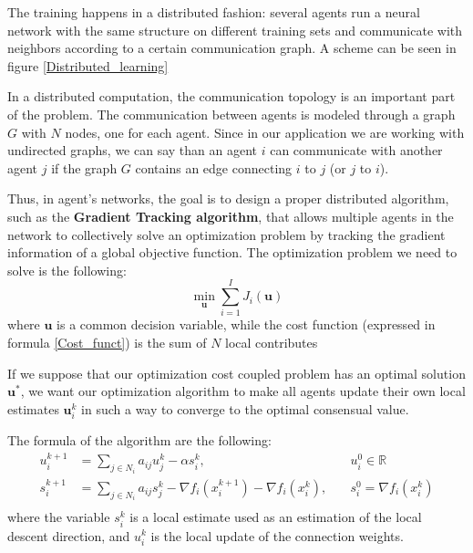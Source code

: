 \documentclass[a4paper,11pt,oneside]{book}
\begin{document}
The training happens in a distributed fashion: several agents run a neural network with the same structure on different training sets and communicate with neighbors according to a certain communication graph. A scheme can be seen in figure \ref{Distributed_learning}

\bigskip
In a distributed computation, the communication topology is an important part of the problem. The communication between agents is modeled through a graph $G$ with $N$ nodes, one for each agent. Since in our application we are working with undirected graphs, we can say than an agent $i$ can communicate with another agent $j$ if the graph $G$ contains an edge connecting $i$ to $j$ (or $j$ to $i$).

\bigskip
Thus, in agent's networks, the goal is to design a proper distributed algorithm, such as the \textbf{Gradient Tracking algorithm}, that allows multiple agents in the network to collectively solve an optimization problem by tracking the gradient information of a global objective function.
The optimization problem we need to solve is the following:
\begin{equation}
\min_{\textbf{u}} \sum_{i=1}^I J_i(\textbf{u})
\end{equation}
where $\textbf{u}$ is a common decision variable, while the cost function (expressed in formula \ref{Cost_funct}) is the sum of $N$ local contributes

\bigskip
If we suppose that our optimization cost coupled problem has an optimal solution $\textbf{u}^*$, we want our optimization algorithm to make all agents update their own local estimates $\textbf{u}_i^k$ in such a way to converge to the optimal consensual value.

The formula of the algorithm are the following:
\begin {equation}
\begin{aligned}
u_i^{k+1} &= \sum_{j \in N_i} a_{ij} u_j^k - \alpha s_i^k, \quad & u_i^0 \in \mathbb{R}\\
s_i^{k+1}   &= \sum_{j \in N_i} a_{ij} s_j^k - \nabla f_i(x_i^{k+1}) - \nabla f_i(x_i^k) , \quad & s_i^0 = \nabla f_i(x_i^k) \\
\end{aligned}
\end{equation}
where the variable $s_i^k$ is a local estimate used as an estimation of the local descent direction, and $u_i^k$ is the local update of the connection weights. 
\end{document}

